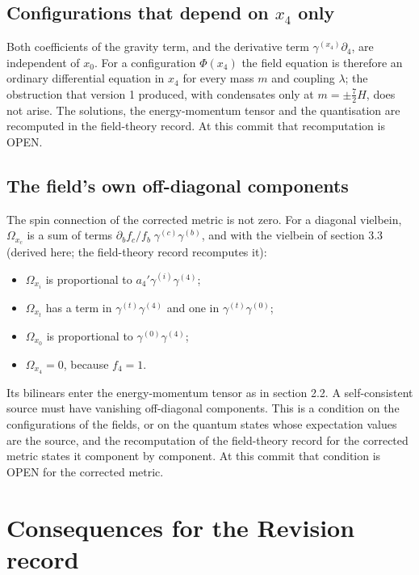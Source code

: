 \documentclass[11pt]{article}
\begin{document}
\subsection{Configurations that depend on \texorpdfstring{$x_4$}{x\_4} only}

Both coefficients of the gravity term, and the derivative term $\gamma^{(x_4)}\partial_4$, are independent of $x_0$. For a configuration $\Phi(x_4)$ the field equation is therefore an ordinary differential equation in $x_4$ for every mass $m$ and coupling $\lambda$; the obstruction that version 1 produced, with condensates only at $m = \pm\frac72 H$, does not arise. The solutions, the energy-momentum tensor and the quantisation are recomputed in the field-theory record. At this commit that recomputation is OPEN.

\subsection{The field's own off-diagonal components}

The spin connection of the corrected metric is not zero. For a diagonal vielbein, $\Omega_{x_c}$ is a sum of terms $\partial_b f_c/f_b\;\gamma^{(c)}\gamma^{(b)}$, and with the vielbein of section 3.3 (derived here; the field-theory record recomputes it):

\begin{itemize}
\item $\Omega_{x_i}$ is proportional to $a_4'\gamma^{(i)}\gamma^{(4)}$;
\item $\Omega_{x_t}$ has a term in $\gamma^{(t)}\gamma^{(4)}$ and one in $\gamma^{(t)}\gamma^{(0)}$;
\item $\Omega_{x_0}$ is proportional to $\gamma^{(0)}\gamma^{(4)}$;
\item $\Omega_{x_4} = 0$, because $f_4 = 1$.
\end{itemize}

Its bilinears enter the energy-momentum tensor as in section 2.2. A self-consistent source must have vanishing off-diagonal components. This is a condition on the configurations of the fields, or on the quantum states whose expectation values are the source, and the recomputation of the field-theory record for the corrected metric states it component by component. At this commit that condition is OPEN for the corrected metric.

\section{Consequences for the Revision record}
\end{document}
